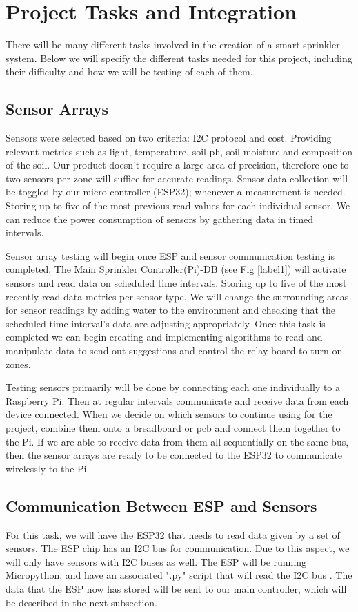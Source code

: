 \documentclass[letterpaper, 10 pt, conference]{ieeeconf}  %
\begin{document}
\section{Project Tasks and Integration}
There will be many different tasks involved in the creation of a smart sprinkler system. Below we will specify the different tasks needed for this project, including their difficulty and how we will be testing of each of them.

\subsection{Sensor Arrays}
Sensors were selected based on two criteria: I2C protocol and cost. Providing relevant metrics such as light, temperature, soil ph, soil moisture and composition of the soil. Our product doesn't require a large area of precision, therefore one to two sensors per zone will suffice for accurate readings. Sensor data collection will be toggled by our micro controller (ESP32); whenever a measurement is needed. Storing up to five of the most previous read values for each individual sensor. We can reduce the power consumption of sensors by gathering data in timed intervals.

Sensor array testing will begin once ESP and sensor communication testing is completed. The Main Sprinkler Controller(Pi)-DB (see Fig \ref{label1}) will activate sensors and read data on scheduled time intervals. Storing up to five of the most recently read data metrics per sensor type. We will change the surrounding areas for sensor readings by adding water to the environment and checking that the scheduled time interval's data are adjusting appropriately. Once this task is completed we can begin creating and implementing algorithms to read and manipulate data to send out suggestions and control the relay board to turn on zones.

Testing sensors primarily will be done by connecting each one individually to a Raspberry Pi. Then at regular intervals communicate and receive data from each device connected. When we decide on which sensors to continue using for the project, combine them onto a breadboard or pcb and connect them together to the Pi. If we are able to receive data from them all sequentially on the same bus, then the sensor arrays are ready to be connected to the ESP32 to communicate wirelessly to the Pi.

\subsection{Communication Between ESP and Sensors}
For this task, we will have the ESP32 that needs to read data given by a set of sensors. The ESP chip has an I2C bus for communication. Due to this aspect, we will only have sensors with I2C buses as well. The ESP will be running Micropython, and have an associated ".py" script that will read the I2C bus \cite{LowCostBLE}. The data that the ESP now has stored will be sent to our main controller, which will be described in the next subsection.
\end{document}
